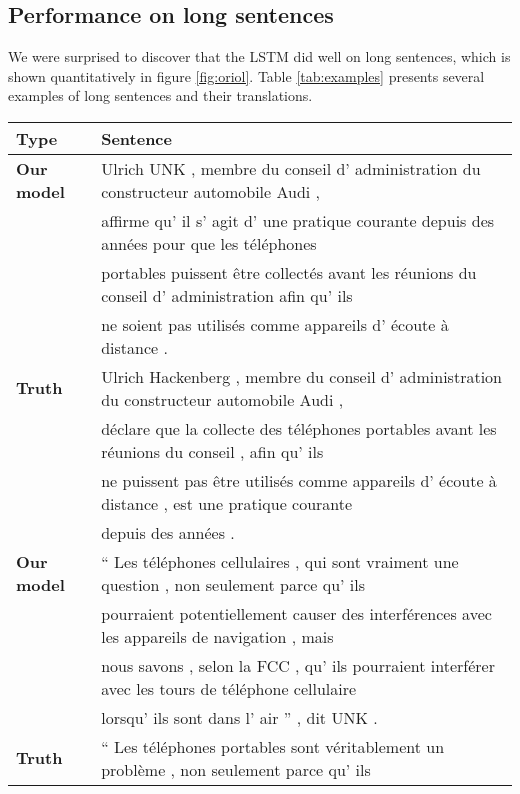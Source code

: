 \documentclass{article} \usepackage{nips14submit_e}
\begin{document}
\subsection{Performance on long sentences}
\label{sec:long_sentences}

We were surprised to discover that the LSTM did well on long
sentences, which is shown quantitatively in figure \ref{fig:oriol}.
Table \ref{tab:examples} presents several examples of long sentences and
their translations. 

\begin{table}[ht!]
\centering
\begin{footnotesize}
\begin{tabular}{|l|l|}
\hline
{\bf  Type} & {\bf Sentence} \\ 
\hline
\hline
{\bf Our model} & Ulrich UNK , membre du conseil d' administration du constructeur automobile Audi , \\
& affirme qu' il s' agit d' une pratique courante depuis des ann\'{e}es pour que les t\'{e}l\'{e}phones \\
& portables  puissent  \^{e}tre collect\'{e}s avant les r\'{e}unions du conseil d' administration afin qu' ils\\
&  ne soient pas  utilis\'{e}s comme appareils d' \'{e}coute \`{a} distance .\\
\hline
{\bf  Truth} &  Ulrich Hackenberg , membre du conseil d' administration du constructeur automobile Audi ,   \\
& d\'{e}clare que la collecte des t\'{e}l\'{e}phones portables avant les r\'{e}unions du conseil , afin qu' ils  \\
& ne puissent pas \^{e}tre utilis\'{e}s comme appareils d' \'{e}coute \`{a} distance , est une pratique courante \\ 
& depuis des ann\'{e}es .\\
\hline\hline
{\bf Our model} & 
`` Les t\'{e}l\'{e}phones cellulaires , qui sont vraiment une question , non seulement parce qu' ils \\
& pourraient potentiellement causer des interf\'{e}rences avec les appareils de navigation , mais \\
& nous savons , selon la FCC , qu' ils pourraient interf\'{e}rer avec les tours de t\'{e}l\'{e}phone cellulaire \\
& lorsqu' ils sont dans l' air '' , dit UNK .\\
\hline
{\bf Truth} & 
`` Les t\'{e}l\'{e}phones portables sont v\'{e}ritablement un probl\`{e}me , non seulement parce qu' ils \\

\end{tabular}
\end{footnotesize}
\end{table}
\end{document}
